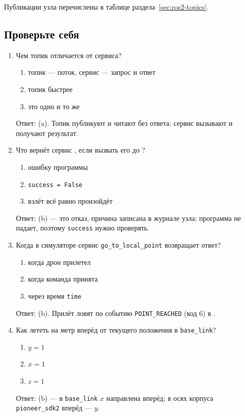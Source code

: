 Публикации узла перечислены в таблице раздела~\ref{sec:ros2-topics}.

\subsection{Проверьте себя}

\begin{enumerate}
  \item Чем топик отличается от сервиса?
    \begin{enumerate}[label=(\alph*)] \item топик --- поток, сервис --- запрос и ответ \item топик быстрее \item это одно и то же \end{enumerate}
    Ответ: (a). Топик публикуют и читают без ответа; сервис вызывают и получают результат.
  \item Что вернёт сервис , если вызвать его до ?
    \begin{enumerate}[label=(\alph*)] \item ошибку программы \item \verb|success = False| \item взлёт всё равно произойдёт \end{enumerate}
    Ответ: (b) --- это отказ, причина записана в журнале узла; программа не падает, поэтому \verb|success| нужно проверять.
  \item Когда в симуляторе сервис \verb|go_to_local_point| возвращает ответ?
    \begin{enumerate}[label=(\alph*)] \item когда дрон прилетел \item когда команда принята \item через время \verb|time| \end{enumerate}
    Ответ: (b). Прилёт ловят по событию \texttt{POINT\_REACHED} (код 6) в .
  \item Как лететь на метр вперёд от текущего положения в \texttt{base\_link}?
    \begin{enumerate}[label=(\alph*)] \item $y = 1$ \item $x = 1$ \item $z = 1$ \end{enumerate}
    Ответ: (b) --- в \texttt{base\_link} $x$ направлена вперёд; в осях корпуса \texttt{pioneer\_sdk2} вперёд --- $y$.

\end{enumerate}
